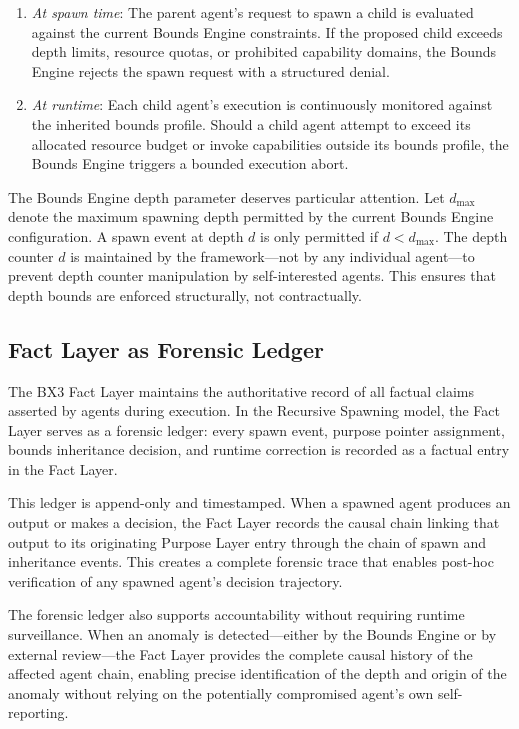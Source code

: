 \begin{enumerate}
    \item \emph{At spawn time}: The parent agent's request to spawn a child is evaluated against the current Bounds Engine constraints. If the proposed child exceeds depth limits, resource quotas, or prohibited capability domains, the Bounds Engine rejects the spawn request with a structured denial.
    \item \emph{At runtime}: Each child agent's execution is continuously monitored against the inherited bounds profile. Should a child agent attempt to exceed its allocated resource budget or invoke capabilities outside its bounds profile, the Bounds Engine triggers a bounded execution abort.
\end{enumerate}

The Bounds Engine depth parameter deserves particular attention. Let $d_{\max}$ denote the maximum spawning depth permitted by the current Bounds Engine configuration. A spawn event at depth $d$ is only permitted if $d < d_{\max}$. The depth counter $d$ is maintained by the framework—not by any individual agent—to prevent depth counter manipulation by self-interested agents. This ensures that depth bounds are enforced structurally, not contractually.

\subsection{Fact Layer as Forensic Ledger}

The BX3 Fact Layer maintains the authoritative record of all factual claims asserted by agents during execution. In the Recursive Spawning model, the Fact Layer serves as a forensic ledger: every spawn event, purpose pointer assignment, bounds inheritance decision, and runtime correction is recorded as a factual entry in the Fact Layer.

This ledger is append-only and timestamped. When a spawned agent produces an output or makes a decision, the Fact Layer records the causal chain linking that output to its originating Purpose Layer entry through the chain of spawn and inheritance events. This creates a complete forensic trace that enables post-hoc verification of any spawned agent's decision trajectory.

The forensic ledger also supports accountability without requiring runtime surveillance. When an anomaly is detected—either by the Bounds Engine or by external review—the Fact Layer provides the complete causal history of the affected agent chain, enabling precise identification of the depth and origin of the anomaly without relying on the potentially compromised agent's own self-reporting.

